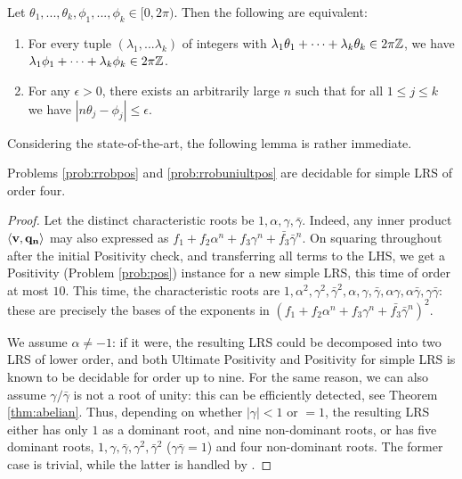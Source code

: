 \begin{theorem}
  \label{thm:kronecker}
  Let $\theta_1, ... , \theta_k, \phi_1, ... , \phi_k \in [0, 2\pi)$. Then the following are equivalent:
  \begin{enumerate}
\item For every tuple $(\lambda_1,...\lambda_k)$ of integers with 
    $\lambda_1 \theta_1 + \cdots +  \lambda_k \theta_k \in 2\pi\mathbb{Z}$, 
  we have \\$\lambda_1 \phi_1 + \cdots + \lambda_k \phi_k \in 2\pi\mathbb{Z}$.
  \item For any $\epsilon > 0$, there exists an arbitrarily large $n$ such that for all 
    $1 \le j \le k$ we have $| n \theta_j - \phi_j| \le \epsilon$.
    \end{enumerate}
  \end{theorem}
 
Considering the state-of-the-art, the following lemma is rather immediate. 
\begin{lemma}
Problems \ref{prob:rrobpos} and \ref{prob:rrobuniultpos} are decidable for simple LRS of order four.
\end{lemma}
\begin{proof}
Let the distinct characteristic roots be $1, \alpha, \gamma, \bar{\gamma}$. Indeed, any inner product $\langle\mathbf{v}, \mathbf{q_n}\rangle$ may also expressed as $f_1 + f_2\alpha^n + f_3 \gamma^n + \bar{f_3}\bar{\gamma}^n$. On squaring throughout after the initial Positivity check, and transferring all terms to the LHS, we get a Positivity (Problem \ref{prob:pos}) instance for a new simple LRS, this time of order at most $10$. This time, the characteristic roots are $1, \alpha^2, \gamma^2, \bar{\gamma}^2, \alpha, \gamma, \bar{\gamma}, \alpha\gamma, \alpha\bar{\gamma}, \gamma\bar{\gamma}$: these are precisely the bases of the exponents in $(f_1 + f_2\alpha^n + f_3 \gamma^n + \bar{f_3}\bar{\gamma}^n)^2$.

We assume $\alpha \ne -1$: if it were, the resulting LRS could be decomposed into two LRS of lower order, and both Ultimate Positivity \cite{ouaknine2014ultimate} and Positivity  \cite{ouaknine2014positivity} for simple LRS is known to be decidable for order up to nine. For the same reason, we can also assume $\gamma/\bar{\gamma}$ is not a root of unity: this can be efficiently detected, see Theorem \ref{thm:abelian}. Thus, depending on whether $|\gamma| < 1$ or $= 1$, the resulting LRS either has only $1$ as a dominant root, and nine non-dominant roots, or has five dominant roots, $1, \gamma, \bar{\gamma}, \gamma^2, \bar{\gamma}^2$ ($\gamma\bar{\gamma} = 1$) and four non-dominant roots. The former case is trivial, while the latter is handled by \cite{ouaknine2014positivity}.
\end{proof}

